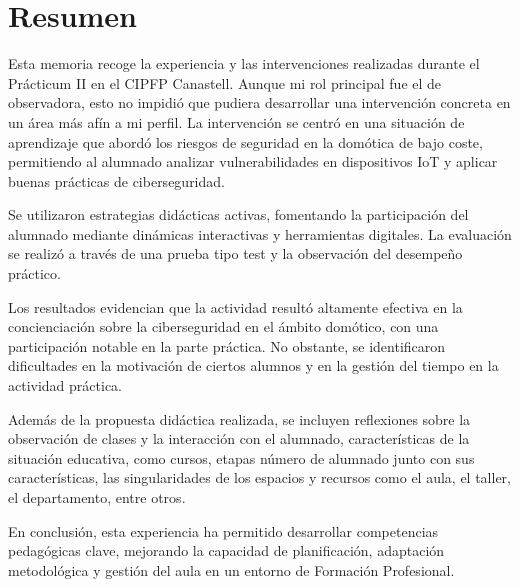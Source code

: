 \chapter{Resumen}

Esta memoria recoge la experiencia y las intervenciones realizadas durante el Prácticum II en el CIPFP Canastell. Aunque mi rol principal fue el de observadora, esto no impidió que pudiera desarrollar una intervención concreta en un área más afín a mi perfil. La intervención se centró en una situación de aprendizaje que abordó los riesgos de seguridad en la domótica de bajo coste, permitiendo al alumnado analizar vulnerabilidades en dispositivos IoT y aplicar buenas prácticas de ciberseguridad. 

Se utilizaron estrategias didácticas activas, fomentando la participación del alumnado mediante dinámicas interactivas y herramientas digitales. La evaluación se realizó a través de una prueba tipo test y la observación del desempeño práctico.

Los resultados evidencian que la actividad resultó altamente efectiva en la concienciación sobre la ciberseguridad en el ámbito domótico, con una participación notable en la parte práctica. No obstante, se identificaron dificultades en la motivación de ciertos alumnos y en la gestión del tiempo en la actividad práctica. 

Además de la propuesta didáctica realizada, se incluyen reflexiones sobre la observación de clases y la interacción con el alumnado, características de la situación educativa, como cursos, etapas número de alumnado junto con sus características, las singularidades de los espacios y recursos como el aula, el taller, el departamento, entre otros.

En conclusión, esta experiencia ha permitido desarrollar competencias pedagógicas clave, mejorando la capacidad de planificación, adaptación metodológica y gestión del aula en un entorno de Formación Profesional.
